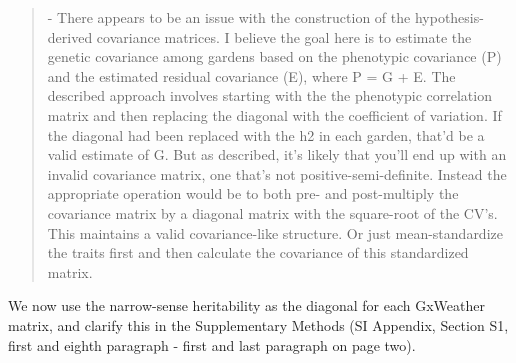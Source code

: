 \documentclass[
  letterpaper,
  DIV=11,
  numbers=noendperiod]{scrartcl}
\begin{document}
\begin{quote}
\begin{tcolorbox}[enhanced jigsaw, rightrule=.15mm, colframe=quarto-callout-warning-color-frame, leftrule=.75mm, arc=.35mm, colback=white, opacityback=0, left=2mm, breakable, toprule=.15mm, bottomrule=.15mm]

- There appears to be an issue with the construction of the
hypothesis-derived covariance matrices. I believe the goal here is to
estimate the genetic covariance among gardens based on the phenotypic
covariance (P) and the estimated residual covariance (E), where P = G +
E. The described approach involves starting with the the phenotypic
correlation matrix and then replacing the diagonal with the coefficient
of variation. If the diagonal had been replaced with the h2 in each
garden, that'd be a valid estimate of G. But as described, it's likely
that you'll end up with an invalid covariance matrix, one that's not
positive-semi-definite. Instead the appropriate operation would be to
both pre- and post-multiply the covariance matrix by a diagonal matrix
with the square-root of the CV's. This maintains a valid covariance-like
structure. Or just mean-standardize the traits first and then calculate
the covariance of this standardized matrix.

\end{tcolorbox}
\end{quote}

We now use the narrow-sense heritability as the diagonal for each
GxWeather matrix, and clarify this in the Supplementary Methods (SI
Appendix, Section S1, first and eighth paragraph - first and last
paragraph on page two).
\end{document}

